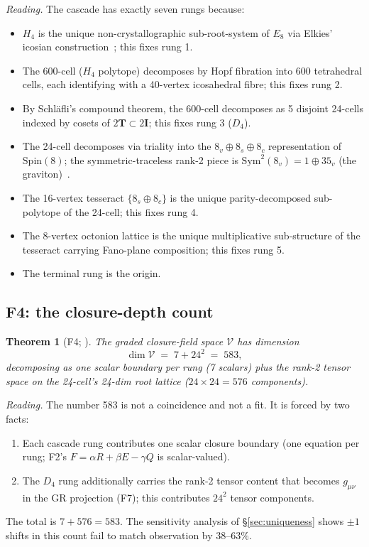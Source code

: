 \documentclass[11pt]{article}
\theoremstyle{plain}
\newtheorem{theorem}{Theorem}[section]
\theoremstyle{definition}
\theoremstyle{remark}
\newcommand{\Vcal}{\mathcal{V}}
\newcommand{\twoI}{2\mathbf{I}}
\newcommand{\twoT}{2\mathbf{T}}
\begin{document}
\noindent\emph{Reading.} The cascade has exactly seven rungs because:
\begin{itemize}[leftmargin=2em]
\item $H_4$ is the unique non-crystallographic sub-root-system of $E_8$ via Elkies' icosian construction~\citep{Elkies1990}; this fixes rung 1.
\item The 600-cell ($H_4$ polytope) decomposes by Hopf fibration into 600 tetrahedral cells, each identifying with a 40-vertex icosahedral fibre; this fixes rung 2.
\item By Schl\"afli's compound theorem, the 600-cell decomposes as 5 disjoint 24-cells indexed by cosets of $\twoT \subset \twoI$; this fixes rung 3 ($D_4$).
\item The 24-cell decomposes via triality into the $8_v \oplus 8_s \oplus 8_c$ representation of $\mathrm{Spin}(8)$; the symmetric-traceless rank-2 piece is $\mathrm{Sym}^2(8_v) = 1 \oplus 35_v$ (the graviton)~\citep[F7]{SmartXXXVI}.
\item The 16-vertex tesseract $\{8_s \oplus 8_c\}$ is the unique parity-decomposed sub-polytope of the 24-cell; this fixes rung 4.
\item The 8-vertex octonion lattice is the unique multiplicative sub-structure of the tesseract carrying Fano-plane composition; this fixes rung 5.
\item The terminal rung is the origin.
\end{itemize}

\subsection{F4: the closure-depth count}

\begin{theorem}[F4; \citealp{SmartXXXVI}]\label{thm:F4}
The graded closure-field space $\Vcal$ has dimension
\[
  \dim \Vcal \;=\; 7 + 24^2 \;=\; 583,
\]
decomposing as one scalar boundary per rung (7 scalars) plus the rank-2 tensor space on the 24-cell's 24-dim root lattice ($24 \times 24 = 576$ components).
\end{theorem}

\noindent\emph{Reading.} The number 583 is not a coincidence and not a fit. It is forced by two facts:
\begin{enumerate}
\item Each cascade rung contributes one scalar closure boundary (one equation per rung; F2's $F = \alpha R + \beta E - \gamma Q$ is scalar-valued).
\item The $D_4$ rung additionally carries the rank-2 tensor content that becomes $g_{\mu\nu}$ in the GR projection (F7); this contributes $24^2$ tensor components.
\end{enumerate}
The total is $7 + 576 = 583$. The sensitivity analysis of \S\ref{sec:uniqueness} shows $\pm 1$ shifts in this count fail to match observation by 38--63\%.
\end{document}
